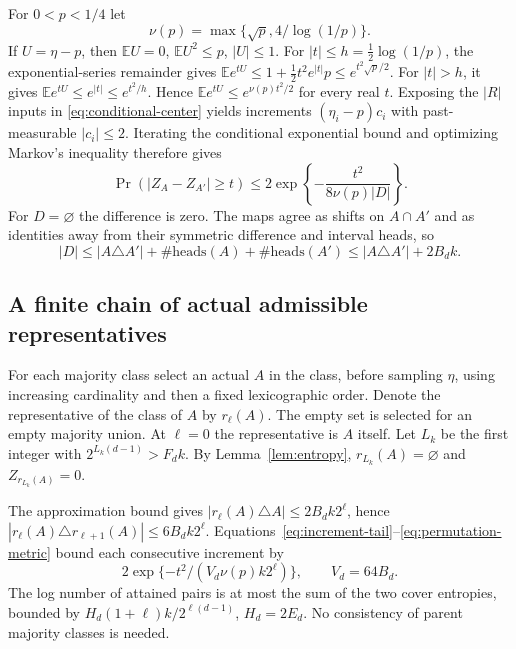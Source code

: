 \documentclass[11pt,a4paper]{article}
\newcommand{\E}{\mathbb E}
\numberwithin{equation}{section}
\begin{document}
For $0<p<1/4$ let
\[
 \nu(p)=\max\{\sqrt p,4/\log(1/p)\}.
\]
If $U=\eta-p$, then $\E U=0$, $\E U^2\le p$, $|U|\le1$.
For $|t|\le h=\tfrac12\log(1/p)$, the exponential-series remainder gives
$\E e^{tU}\le1+\tfrac12t^2e^{|t|}p\le e^{t^2\sqrt p/2}$.
For $|t|>h$, it gives $\E e^{tU}\le e^{|t|}\le e^{t^2/h}$.
Hence $\E e^{tU}\le e^{\nu(p)t^2/2}$ for every real $t$.
Exposing the $|R|$ inputs in \eqref{eq:conditional-center} yields
increments $(\eta_i-p)c_i$ with past-measurable $|c_i|\le2$.
Iterating the conditional exponential bound and optimizing Markov's
inequality therefore gives
\begin{equation}\label{eq:increment-tail}
 \Pr(|Z_A-Z_{A'}|\ge t)
 \le2\exp\left\{-\frac{t^2}{8\nu(p)|D|}\right\}.
\end{equation}
For $D=\varnothing$ the difference is zero.
The maps agree as shifts on $A\cap A'$ and as identities away from
their symmetric difference and interval heads, so
\begin{equation}\label{eq:permutation-metric}
 |D|\le |A\triangle A'|+\#\text{heads}(A)+\#\text{heads}(A')
 \le |A\triangle A'|+2B_dk.
\end{equation}

\subsection{A finite chain of actual admissible representatives}
For each majority class select an actual $A$ in the class, before
sampling $\eta$, using increasing cardinality and then a fixed
lexicographic order. Denote the representative of the class of $A$ by
$r_\ell(A)$. The empty set is selected for an empty majority union.
At $\ell=0$ the representative is $A$ itself. Let $L_k$ be the first
integer with $2^{L_k(d-1)}>F_dk$. By Lemma~\ref{lem:entropy},
$r_{L_k}(A)=\varnothing$ and $Z_{r_{L_k}(A)}=0$.

The approximation bound gives
$|r_\ell(A)\triangle A|\le2B_dk2^\ell$, hence
$|r_\ell(A)\triangle r_{\ell+1}(A)|\le6B_dk2^\ell$.
Equations~\eqref{eq:increment-tail}--\eqref{eq:permutation-metric}
bound each consecutive increment by
\[
 2\exp\{-t^2/(V_d\nu(p)k2^\ell)\},\qquad V_d=64B_d.
\]
The log number of attained pairs is at most the sum of the two cover
entropies, bounded by
$H_d(1+\ell)k/2^{\ell(d-1)}$, $H_d=2E_d$.
No consistency of parent majority classes is needed.
\end{document}
